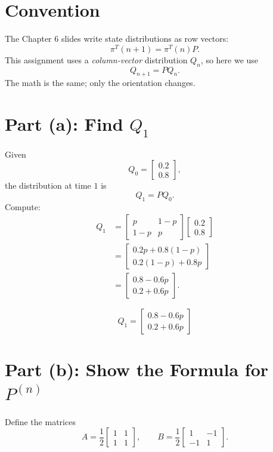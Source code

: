 \documentclass[11pt]{article}
\begin{document}
\section*{Convention}

The Chapter 6 slides write state distributions as row vectors:
\[
    \pi^T(n+1)=\pi^T(n)P.
\]
This assignment uses a \emph{column-vector} distribution \(Q_n\), so here we use
\[
    Q_{n+1}=PQ_n.
\]
The math is the same; only the orientation changes.

\section*{Part (a): Find \(Q_1\)}

Given
\[
    Q_0=
    \begin{bmatrix}
        0.2\\
        0.8
    \end{bmatrix},
\]
the distribution at time \(1\) is
\[
    Q_1 = P Q_0.
\]
Compute:
\[
\begin{aligned}
    Q_1
    &=
    \begin{bmatrix}
        p & 1-p \\
        1-p & p
    \end{bmatrix}
    \begin{bmatrix}
        0.2\\
        0.8
    \end{bmatrix} \\
    &=
    \begin{bmatrix}
        0.2p+0.8(1-p) \\
        0.2(1-p)+0.8p
    \end{bmatrix} \\
    &=
    \begin{bmatrix}
        0.8-0.6p \\
        0.2+0.6p
    \end{bmatrix}.
\end{aligned}
\]

\[
    \boxed{
    Q_1=
    \begin{bmatrix}
        0.8-0.6p\\
        0.2+0.6p
    \end{bmatrix}
    }
\]

\section*{Part (b): Show the Formula for \(P^{(n)}\)}

Define the matrices
\[
    A=
    \frac12
    \begin{bmatrix}
        1 & 1\\
        1 & 1
    \end{bmatrix},
    \qquad
    B=
    \frac12
    \begin{bmatrix}
        1 & -1\\
        -1 & 1
    \end{bmatrix}.
\]
\end{document}
